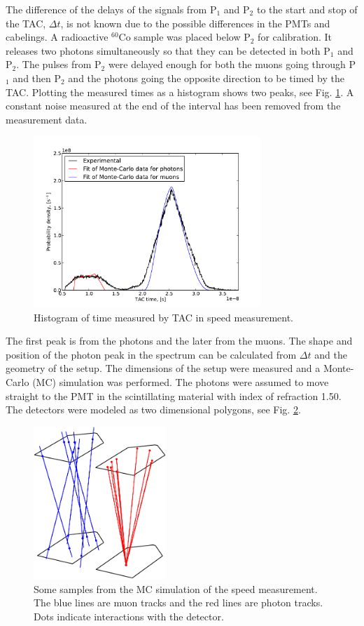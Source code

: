 \documentclass[10pt,twocolumn]{article}
\begin{document}
The difference of the delays of the signals from P$_1$ and P$_2$ to the start and stop of the TAC, $\Delta t$, is not known due to the possible differences in the PMTs and cabelings. A radioactive $^{60}$Co sample was placed below P$_2$ for calibration. It releases two photons simultaneously so that they can be detected in both P$_1$ and P$_2$. The pulses from P$_2$ were delayed enough for both the muons going through P$_1$ and then P$_2$ and the photons going the opposite direction to be timed by the TAC. Plotting the measured times as a histogram shows two peaks, see Fig. \ref{speedHist}. A constant noise measured at the end of the interval has been removed from the measurement data.
\begin{figure}
\centering
\includegraphics[width=8.6cm]{speedFit.pdf}
\caption{Histogram of time measured by TAC in speed measurement.}
\label{speedHist}
\end{figure}
The first peak is from the photons and the later from the muons. The shape and position of the photon peak in the spectrum can be calculated from $\Delta t$ and the geometry of the setup. The dimensions of the setup were measured and a Monte-Carlo (MC) simulation was performed. The photons were assumed to move straight to the PMT in the scintillating material with index of refraction 1.50. The detectors were modeled as two dimensional polygons, see Fig. \ref{MC}.
\begin{figure}
\centering
\includegraphics[width=5cm]{mc-crop.pdf}
\caption{Some samples from the MC simulation of the speed measurement. The blue lines are muon tracks and the red lines are photon tracks. Dots indicate interactions with the detector.}
\label{MC}
\end{figure}
\end{document}
